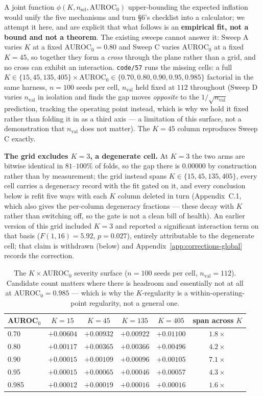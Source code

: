 \documentclass[10pt]{article} %
\begin{document}
A joint function $\phi(K, n_{\text{sel}}, \text{AUROC}_0)$ upper-bounding the
expected inflation would unify the five mechanisms and turn §6's checklist into
a calculator; we attempt it here, and are explicit that what follows is an
\textbf{empirical fit, not a bound and not a theorem}. The existing sweeps
cannot answer it: Sweep A varies $K$ at a fixed $\text{AUROC}_0=0.80$ and Sweep
C varies $\text{AUROC}_0$ at a fixed $K=45$, so together they form a
\emph{cross} through the plane rather than a grid, and no cross can exhibit an
interaction. \texttt{code/57} runs the missing cells: a full
$K\in\{15,45,135,405\}\times\text{AUROC}_0\in\{0.70,0.80,0.90,0.95,0.985\}$
factorial in the same harness, $n=100$ seeds per cell, $n_{\text{val}}$ held
fixed at $112$ throughout (Sweep D varies $n_{\text{val}}$ in isolation and
finds the gap moves \emph{opposite} to the $1/\sqrt{n_{\text{val}}}$
prediction, tracking the operating point instead, which is why we hold it fixed
rather than folding it in as a third axis --- a limitation of this surface, not
a demonstration that $n_{\text{val}}$ does not matter). The $K=45$ column
reproduces Sweep C exactly.

\textbf{The grid excludes $K=3$, a degenerate cell.} At $K=3$ the two arms are
bitwise identical in $81$--$100\%$ of folds, so the gap there is $0.00000$ by
construction rather than by measurement; the grid instead spans
$K\in\{15,45,135,405\}$, every cell carries a degeneracy record with the fit
gated on it, and every conclusion below is refit five ways with each $K$
column deleted in turn (Appendix~C.1, which also gives the per-column
degeneracy fractions --- these decay with $K$ rather than switching off, so
the gate is not a clean bill of health). An earlier version of this grid
included $K=3$ and reported a significant interaction term on that basis
($F(1,16)=5.92$, $p=0.027$), entirely attributable to the degenerate cell;
that claim is withdrawn (below) and Appendix~\ref{app:corrections-global}
records the correction.

\begin{table}[!ht]
\centering
\small
\begin{tabular}{lccccc}
\toprule
AUROC$_0$ & $K=15$ & $K=45$ & $K=135$ & $K=405$ & span across $K$ \\
\midrule
0.70  & $+0.00604$ & $+0.00932$ & $+0.00922$ & $+0.01100$ & $1.8\times$ \\
0.80  & $+0.00117$ & $+0.00365$ & $+0.00366$ & $+0.00496$ & $4.2\times$ \\
0.90  & $+0.00015$ & $+0.00109$ & $+0.00096$ & $+0.00105$ & $7.1\times$ \\
0.95  & $+0.00015$ & $+0.00065$ & $+0.00046$ & $+0.00057$ & $4.3\times$ \\
0.985 & $+0.00012$ & $+0.00019$ & $+0.00016$ & $+0.00016$ & $1.6\times$ \\
\bottomrule
\end{tabular}
\caption{The $K\times$AUROC$_0$ severity surface ($n=100$ seeds per cell,
$n_{\text{val}}=112$). Candidate count matters where there is headroom and
essentially not at all at AUROC$_0=0.985$ --- which is why the $K$-regularity
is a within-operating-point regularity, not a general one.}
\end{table}
\end{document}
